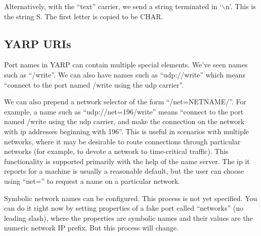 \documentclass[a4]{article}
\begin{document}
\noindent
Alternatively, with the ``text'' carrier, we send a string terminated
in `$\backslash$n'.  This is the string S.  The first letter is copied
to be CHAR.



\subsection{YARP URIs}

Port names in YARP can contain multiple special elements.
We've seen names such as ``/write''.  We can also have
names such as ``udp://write'' which means ``connect
to the port named /write using the udp carrier''.

We can also prepend a network selector of the form
``/net=NETNAME/''.  For example, a name such as
``udp://net=196/write'' means ``connect to the 
port named /write using the udp carrier, and make the
connection on the network with ip addresses beginning with
196''.
%
This is useful in scenarios with multiple networks, where it may be
desirable to route connections through particular networks (for
example, to devote a network to time-critical traffic).  This
functionality is supported primarily with the help of the name server.
The ip it reports for a machine is usually a reasonable default, but
the user can choose using ``net='' to request a name on a particular
network.

Symbolic network names can be configured.  This process is not yet
specified.  You can do it right now by setting properties of a fake
port called ``networks'' (no leading slash), where the properties are
symbolic names and their values are the numeric network IP prefix.
But this process will change.




\end{document}
